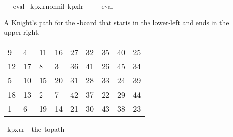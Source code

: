 \begin{isabellebody}
\isadelimproof
\ %
\endisadelimproof
%
\isatagproof
{}\isamarkupfalse%
\ eval%
\endisatagproof
{\isafoldproof}%
%
\isadelimproof
%
\endisadelimproof
\isanewline
\isanewline
{}\isamarkupfalse%
\ kp{\isacharunderscore}{\kern0pt}{}x{}{\isacharunderscore}{\kern0pt}lr{\isacharunderscore}{\kern0pt}non{\isacharunderscore}{\kern0pt}nil{\isacharcolon}{\kern0pt}\ {\isachardoublequoteopen}kp{}x{}lr\ {\isasymnoteq}\ {\isacharbrackleft}{\kern0pt}{\isacharbrackright}{\kern0pt}{\isachardoublequoteclose}%
\isadelimproof
\ %
\endisadelimproof
%
\isatagproof
{}\isamarkupfalse%
\ eval%
\endisatagproof
{\isafoldproof}%
%
\isadelimproof
%
\endisadelimproof
%
\begin{isamarkuptext}%
A Knight's path for the -board that starts in the lower-left and ends in the upper-right.
  \begin{table}[H]
    \begin{tabular}{lllllllll}
       9 &  4 & 11 & 16 & 27 & 32 & 35 & 40 & 25 \\
      12 & 17 &  8 &  3 & 36 & 41 & 26 & 45 & 34 \\
       5 & 10 & 15 & 20 & 31 & 28 & 33 & 24 & 39 \\
      18 & 13 &  2 &  7 & 42 & 37 & 22 & 29 & 44 \\
       1 &  6 & 19 & 14 & 21 & 30 & 43 & 38 & 23
    \end{tabular}
  \end{table}%
\end{isamarkuptext}\isamarkuptrue%
\isamarkupfalse%
\ {\isachardoublequoteopen}kp{}x{}ur\ {\isasymequiv}\ the\ {\isacharparenleft}{\kern0pt}to{\isacharunderscore}{\kern0pt}path\ \isanewline
\ \ {\isacharbrackleft}{\kern0pt}{\isacharbrackleft}{\kern0pt}{}{\isacharcomma}{\kern0pt}{}{\isacharcomma}{\kern0pt}{}{}{\isacharcomma}{\kern0pt}{}{}{\isacharcomma}{\kern0pt}{}{}{\isacharcomma}{\kern0pt}{}{}{\isacharcomma}{\kern0pt}{}{}{\isacharcomma}{\kern0pt}{}{}{\isacharcomma}{\kern0pt}{}{}{\isacharbrackright}{\kern0pt}{\isacharcomma}{\kern0pt}\isanewline
\ \ {\isacharbrackleft}{\kern0pt}{}{}{\isacharcomma}{\kern0pt}{}{}{\isacharcomma}{\kern0pt}{}{\isacharcomma}{\kern0pt}{}{\isacharcomma}{\kern0pt}{}{}{\isacharcomma}{\kern0pt}{}{}{\isacharcomma}{\kern0pt}{}{}{\isacharcomma}{\kern0pt}{}{}{\isacharcomma}{\kern0pt}{}{}{\isacharbrackright}{\kern0pt}{\isacharcomma}{\kern0pt}\isanewline

\end{isabellebody}
